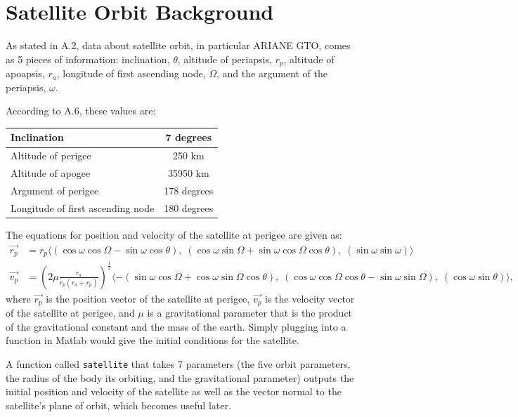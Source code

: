 \documentclass{article}
\begin{document}
\section{Satellite Orbit Background}

As stated in A.2, data about satellite orbit, in particular ARIANE
GTO, comes as 5 pieces of information: inclination, $\theta$, altitude of
periapsis, $r_p$, altitude of apoapsis, $r_a$, longitude of first
ascending node, $\Omega$, and the argument of the periapsis, $\omega$.

According to A.6, these values are: \\
\begin{tabular}{|l|c|}
  \hline
  Inclination & 7 degrees \\ \hline
  Altitude of perigee & 250 km \\ \hline
  Altitude of apogee & 35950 km\\ \hline
  Argument of perigee & 178 degrees \\ \hline
  Longitude of first ascending node & 180 degrees \\ 
  \hline
\end{tabular}
\bigskip

\noindent
The equations for position and velocity of the satellite at
perigee are given as:
\begin{align}
  \vec{r_p} &= r_p  \langle
  (\cos{\omega}\cos{\Omega}-\sin{\omega}\cos{\theta}), \;
  (\cos{\omega}\sin{\Omega}+\sin{\omega}\cos{\Omega}\cos{\theta}), \;
  (\sin{\omega}\sin{\omega}) \rangle \\
  \vec{v_p} &= (2\mu\frac{r_a}{r_p(r_a+r_p)})^{\frac{1}{2}}
  \langle
  -(\sin{\omega}\cos{\Omega}+\cos{\omega}\sin{\Omega}\cos{\theta}),
  \;
  (\cos{\omega}\cos{\Omega}\cos{\theta}-\sin{\omega}\sin{\Omega}),
  \;
  (\cos{\omega}\sin{\theta})
  \rangle,
\end{align}
where $\vec{r_p}$ is the position vector of the satellite at perigee,
$\vec{v_p}$ is the velocity vector of the satellite at perigee,
and $\mu$ is a gravitational parameter that is the product of the
gravitational constant and the mass of the earth. Simply plugging into
a function in Matlab would give the initial conditions for the
satellite.

A function called \verb[satellite[ that takes 7 parameters (the five
orbit parameters, the radius of the body its orbiting, and the
gravitational parameter) outputs the initial
position and velocity of the satellite as well as the vector normal to
the satellite's plane of orbit, which becomes useful later.
\end{document}
